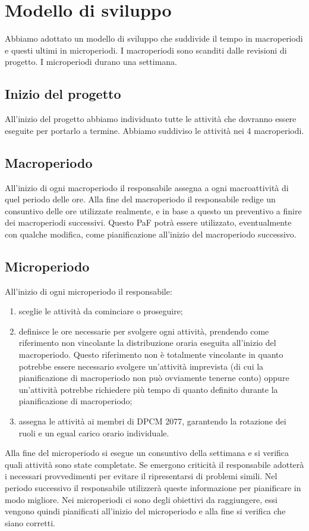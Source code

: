 \section{Modello di sviluppo}
Abbiamo adottato un modello di sviluppo che suddivide il tempo in macroperiodi e questi ultimi in microperiodi. I macroperiodi sono scanditi dalle revisioni di progetto. I microperiodi durano una settimana.

\subsection{Inizio del progetto}
All'inizio del progetto abbiamo individuato tutte le attività che dovranno essere eseguite per portarlo a termine.
Abbiamo suddiviso le attività nei 4 macroperiodi.
\subsection{Macroperiodo}
All'inizio di ogni macroperiodo il responsabile assegna a ogni macroattività di quel periodo delle ore.
Alla fine del macroperiodo il responsabile redige un consuntivo delle ore utilizzate realmente, e in base a questo un preventivo a finire dei macroperiodi successivi. Questo PaF potrà essere utilizzato, eventualmente con qualche modifica, come pianificazione all'inizio del macroperiodo successivo.
\subsection{Microperiodo}
All'inizio di ogni microperiodo il responsabile:
\begin{enumerate}
	\item sceglie le attività da cominciare o proseguire;
	\item definisce le ore necessarie per svolgere ogni attività, prendendo come riferimento non vincolante la distribuzione oraria eseguita all'inizio del macroperiodo. Questo riferimento non è totalmente vincolante in quanto potrebbe essere necessario svolgere un'attività imprevista (di cui la pianificazione di macroperiodo non può ovviamente tenerne conto) oppure un'attività potrebbe richiedere più tempo di quanto definito durante la pianificazione di macroperiodo;
	\item assegna le attività ai membri di DPCM 2077, garantendo la rotazione dei ruoli e un egual carico orario individuale.
\end{enumerate}  

\indent Alla fine del microperiodo si esegue un consuntivo della settimana e si verifica quali attività sono state completate. Se emergono criticità il responsabile adotterà i necessari provvedimenti per evitare il ripresentarsi di problemi simili. Nel periodo successivo il responsabile utilizzerà queste informazione per pianificare in modo migliore. Nei microperiodi ci sono degli obiettivi da raggiungere, essi vengono quindi pianificati all'inizio del microperiodo e alla fine si verifica che siano corretti.

